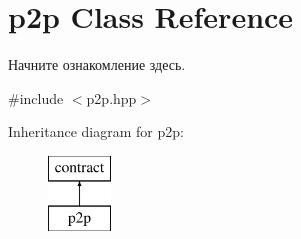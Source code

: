 \hypertarget{classp2p}{}\section{p2p Class Reference}
\label{classp2p}


Начните ознакомление здесь.  




{\ttfamily \#include $<$p2p.\+hpp$>$}

Inheritance diagram for p2p\+:\begin{figure}[H]
\begin{center}
\leavevmode
\includegraphics[height=2.000000cm]{classp2p}
\end{center}
\end{figure}
